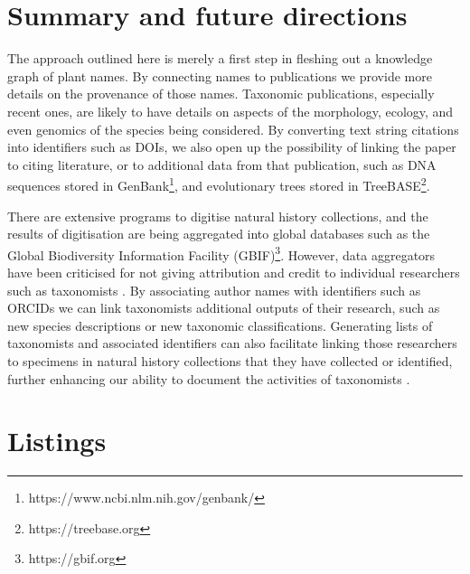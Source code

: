 \documentclass[runningheads]{llncs}
\begin{document}
\section{Summary and future directions}

The approach outlined here is merely a first step in fleshing out a knowledge graph of plant names. By connecting names to publications we provide more details on the provenance of those names. Taxonomic publications, especially recent ones, are likely to have details on aspects of the morphology, ecology, and even genomics of the  species being considered. By converting text string citations into identifiers such as DOIs, we also open up the possibility of linking the paper to citing literature, or to additional data from that publication, such as DNA sequences stored in GenBank\footnote{https://www.ncbi.nlm.nih.gov/genbank/}, and evolutionary trees stored in TreeBASE\footnote{https://treebase.org}.

There are extensive programs to digitise natural history collections, and the results of digitisation are being aggregated into global databases such as the Global Biodiversity Information Facility (GBIF)\footnote{https://gbif.org}. However, data aggregators have been criticised for not giving attribution and credit to individual researchers such as taxonomists \cite{franz_increase_2018}.  By associating author names with identifiers such as ORCIDs we can link taxonomists additional outputs of their research, such as new species descriptions or new taxonomic classifications. Generating lists of taxonomists and associated identifiers can also facilitate linking those researchers to specimens in natural history collections that they have collected or identified, further enhancing our ability to document the activities of taxonomists \cite{shorthouse_quantifying_2019}.


%
%
%


%

\section{Listings}
\end{document}
